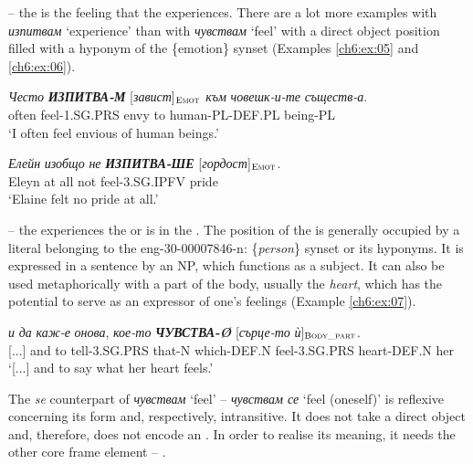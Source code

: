 \documentclass[output=paper,colorlinks,citecolor=brown]{langscibook}
\begin{document}
 -- the  is the feeling that the  experiences. There are a lot more examples with \textit{изпитвам} `experience' than with \textit{чувствам} `feel' with a direct object position filled with a hyponym of the \{emotion\} synset (Examples \ref{ch6:ex:05} and \ref{ch6:ex:06}). 

\begin{exe} 
\ex  \label{ch6:ex:05} 
\gll \textit{Често} \textit{\textbf{ИЗПИТВА-М}} [\textit{завист}]$_{\text{\textsc{Emot}}}$ \textit{към} \textit{човешк-и-те} \textit{съществ-а}. \\
often feel-1.SG.PRS envy to human-PL-DEF.PL being-PL \\  %
\glt `I often feel envious of human beings.' 
\end{exe}

\begin{exe} 
\ex  \label{ch6:ex:06} 
\gll \textit{Елейн} \textit{изобщо} \textit{не} \textit{\textbf{ИЗПИТВА-ШЕ}} [\textit{гордост}]$_{\text{\textsc{Emot}}}$. \\ 
Eleyn {at all} not {feel-3.SG.IPFV} pride \\  %
\glt `Elaine felt no pride at all.' 
\end{exe}

 -- the  experiences the  or is in the . The position of the  is generally occupied by a literal belonging to the eng-30-00007846-n: \{\textit{person}\} synset or its hyponyms. It is expressed in a sentence by an NP, which functions as a subject. It can also be used metaphorically with a part of the body, usually the \textit{heart}, which has the potential to serve as an expressor of one’s feelings (Example \ref{ch6:ex:07}).

\begin{exe} 
\ex  \label{ch6:ex:07} 
\gll [...] \textit{и} \textit{да} \emph{каж-е} \textit{онова}, \textit{кое-то} \textit{\textbf{ЧУВСТВА-Ø}}  [\textit{сърце-то} \textit{ѝ}]$_{\text{\textsc{Body\_part}}}$.\\
{}[...] and to tell-3.SG.PRS that-N which-DEF.N feel-3.SG.PRS heart-DEF.N her \\ %
\glt `[...] and to say what her heart feels.' 
\end{exe}

The \textit{se} counterpart of \textit{чувствам} `feel' – \textit{чувствам се} `feel (oneself)' is reflexive concerning its form and, respectively, intransitive. It does not take a direct object and, therefore, does not encode an . In order to realise its meaning, it needs the other core frame element -- .
\end{document}

